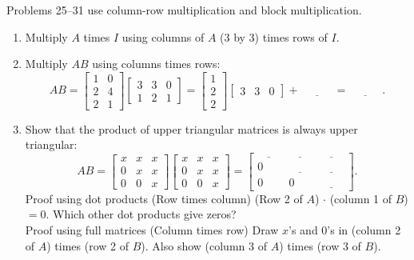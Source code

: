 \documentclass[14pt, a4paper]{article}
\begin{document}
\noindent Problems 25--31 use column-row multiplication and block multiplication.

\begin{enumerate}[resume]

    \item Multiply $A$ times $I$ using columns of $A$ ($3$ by $3$) times rows of $I$.

    \item Multiply $AB$ using columns times rows:
          \[
              AB = \begin{bmatrix} 1 & 0 \\ 2 & 4 \\ 2 & 1 \end{bmatrix}
              \begin{bmatrix} 3 & 3 & 0 \\ 1 & 2 & 1 \end{bmatrix}
              = \begin{bmatrix} 1 \\ 2 \\ 2 \end{bmatrix}
              \begin{bmatrix} 3 & 3 & 0 \end{bmatrix}
              + \underline{\hspace{3em}} = \underline{\hspace{3em}}.
          \]

    \item Show that the product of upper triangular matrices is always upper triangular:
          \[
              AB = \begin{bmatrix} x & x & x \\ 0 & x & x \\ 0 & 0 & x \end{bmatrix}
              \begin{bmatrix} x & x & x \\ 0 & x & x \\ 0 & 0 & x \end{bmatrix}
              = \begin{bmatrix} \underline{\hspace{2em}} & \underline{\hspace{2em}} & \underline{\hspace{2em}} \\
                              0                        & \underline{\hspace{2em}} & \underline{\hspace{2em}} \\
                              0                        & 0                        & \underline{\hspace{2em}}\end{bmatrix}.
          \]
          Proof using dot products (Row times column) \quad (Row 2 of $A$) $\cdot$ (column 1 of $B$) $= 0$. Which other dot products give zeros?\\
          Proof using full matrices (Column times row) \quad Draw $x$'s and $0$'s in (column 2 of $A$) times (row 2 of $B$). Also show (column 3 of $A$) times (row 3 of $B$).


\end{enumerate}
\end{document}
